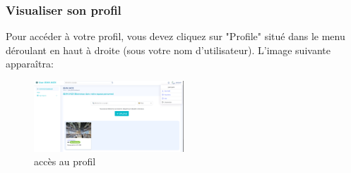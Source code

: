 \documentclass[12pt]{article}
\begin{document}
\medskip
\subsubsection{Visualiser son profil}
Pour accéder à votre profil, vous devez cliquez sur "Profile" situé dans le menu déroulant en haut à droite (sous votre nom d'utilisateur). L'image suivante apparaîtra: 
\medskip

\begin{figure}[h!]
\centering
\includegraphics[width=0.5\textwidth]{./images/profile-access.png}
\caption{accès au profil}
\label{fig:accès au profil}
\end{figure}

\medskip
\end{document}
